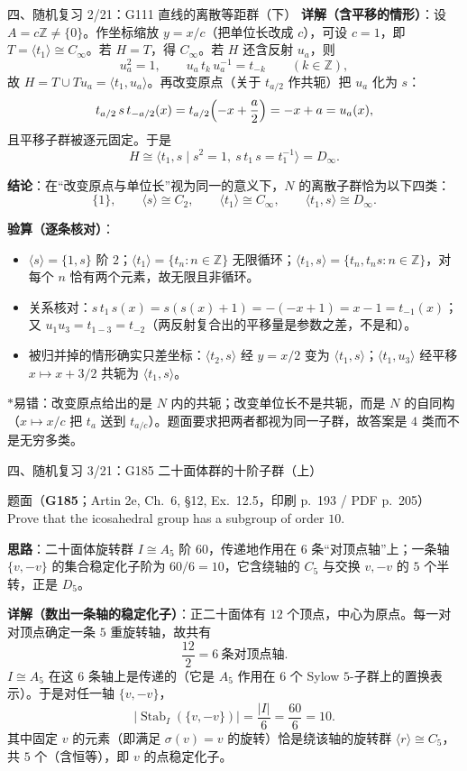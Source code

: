 \documentclass[aspectratio=169,10pt,fontset=none]{ctexbeamer}
\newcommand{\ex}[1]{\textcolor{accent}{\footnotesize\bfseries #1}}
\newcommand{\key}[1]{\textcolor{ink}{\bfseries #1}}
\newcommand{\starpt}{\textcolor{accent}{\bfseries$\ast$}}
\begin{document}
\begin{frame}[t]{四、随机复习 2/21：G111 直线的离散等距群（下）}
\scriptsize
\key{详解（含平移的情形）}：设 $A=c\mathbb Z\ne\{0\}$。作坐标缩放 $y=x/c$（把单位长改成 $c$），可设 $c=1$，即 $T=\langle t_1\rangle\cong C_\infty$。若 $H=T$，得 $C_\infty$。若 $H$ 还含反射 $u_a$，则
\[ u_a^2=1,\qquad u_a\,t_k\,u_a^{-1}=t_{-k}\qquad(k\in\mathbb Z), \]
故 $H=T\cup T u_a=\langle t_1,u_a\rangle$。再改变原点（关于 $t_{a/2}$ 作共轭）把 $u_a$ 化为 $s$：
\[ t_{a/2}\,s\,t_{-a/2}(x)=t_{a/2}\Bigl(-x+\frac a2\Bigr)=-x+a=u_a(x), \]
且平移子群被逐元固定。于是
\[ H\cong\langle t_1,s\mid s^2=1,\ s\,t_1\,s=t_1^{-1}\rangle=D_\infty. \]

\key{结论}：在“改变原点与单位长”视为同一的意义下，$N$ 的离散子群恰为以下四类：
\[ \{1\},\qquad \langle s\rangle\cong C_2,\qquad \langle t_1\rangle\cong C_\infty,\qquad \langle t_1,s\rangle\cong D_\infty. \]

\key{验算（逐条核对）}：
\begin{itemize}
\item $\langle s\rangle=\{1,s\}$ 阶 $2$；$\langle t_1\rangle=\{t_n:n\in\mathbb Z\}$ 无限循环；$\langle t_1,s\rangle=\{t_n,t_ns:n\in\mathbb Z\}$，对每个 $n$ 恰有两个元素，故无限且非循环。
\item 关系核对：$s\,t_1\,s(x)=s(s(x)+1)=-(-x+1)=x-1=t_{-1}(x)$；又 $u_1u_3=t_{1-3}=t_{-2}$（两反射复合出的平移量是参数之差，不是和）。
\item 被归并掉的情形确实只差坐标：$\langle t_2,s\rangle$ 经 $y=x/2$ 变为 $\langle t_1,s\rangle$；$\langle t_1,u_3\rangle$ 经平移 $x\mapsto x+3/2$ 共轭为 $\langle t_1,s\rangle$。
\end{itemize}
\starpt 易错：改变原点给出的是 $N$ 内的共轭；改变单位长不是共轭，而是 $N$ 的自同构（$x\mapsto x/c$ 把 $t_a$ 送到 $t_{a/c}$）。题面要求把两者都视为同一子群，故答案是 $4$ 类而不是无穷多类。
\end{frame}

\begin{frame}[t]{四、随机复习 3/21：G185 二十面体群的十阶子群（上）}
\label{ex:G185}
\scriptsize
\begin{block}{\footnotesize 题面（\ex{G185}；Artin 2e, Ch.~6, §12, Ex.~12.5，印刷 p.~193 / PDF p.~205）}
Prove that the icosahedral group has a subgroup of order $10$.
\end{block}
\key{思路}：二十面体旋转群 $I\cong A_5$ 阶 $60$，传递地作用在 $6$ 条“对顶点轴”上；一条轴 $\{v,-v\}$ 的集合稳定化子阶为 $60/6=10$，它含绕轴的 $C_5$ 与交换 $v,-v$ 的 $5$ 个半转，正是 $D_5$。

\key{详解（数出一条轴的稳定化子）}：正二十面体有 $12$ 个顶点，中心为原点。每一对对顶点确定一条 $5$ 重旋转轴，故共有
\[ \frac{12}{2}=6\ \text{条对顶点轴}. \]
$I\cong A_5$ 在这 $6$ 条轴上是传递的（它是 $A_5$ 作用在 $6$ 个 Sylow $5$-子群上的置换表示）。于是对任一轴 $\{v,-v\}$，
\[ |\operatorname{Stab}_I(\{v,-v\})|=\frac{|I|}{6}=\frac{60}{6}=10. \]
其中固定 $v$ 的元素（即满足 $\sigma(v)=v$ 的旋转）恰是绕该轴的旋转群 $\langle r\rangle\cong C_5$，共 $5$ 个（含恒等），即 $v$ 的点稳定化子。
\end{frame}
\end{document}

